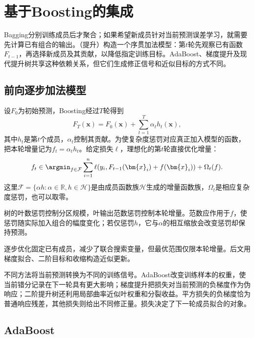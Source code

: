 \section{基于Boosting的集成}
\label{sec:ensemble-boosting}

Bagging分别训练成员后才聚合；如果希望新成员针对当前预测误差学习，就需要先计算已有组合的输出。（提升）构造一个序贯加法模型：第$t$轮先观察已有函数$F_{t-1}$，再选择新成员及其贡献，以降低指定训练目标。AdaBoost、梯度提升及现代提升树共享这种依赖关系，但它们生成修正信号和近似目标的方式不同。

\subsection{前向逐步加法模型}
\label{sec:ensemble-stagewise-additive}

设$F_0$为初始预测，Boosting经过$T$轮得到
\begin{equation}
  F_T(\bm{x})
  =
  F_0(\bm{x})
  +
  \sum_{t=1}^{T}\alpha_t h_t(\bm{x}),
  \label{eq:ensemble-additive-model}
\end{equation}
其中$h_t$是第$t$个成员，$\alpha_t$控制其贡献。为使复杂度惩罚对应真正加入模型的函数，把本轮增量记为$f_t=\alpha_t h_t$。给定损失$\ell$，理想化的第$t$轮直接优化增量：
\begin{equation}
  f_t
  \in
  \argmin_{f\in\mathcal{F}}
  \sum_{i=1}^{n}
  \ell\!\left(
    y_i,
    F_{t-1}(\bm{x}_i)+f(\bm{x}_i)
  \right)
  +\Omega_t(f).
  \label{eq:ensemble-forward-stagewise}
\end{equation}
这里$\mathcal{F}=\{\alpha h:\alpha\in\mathbb{R},h\in\mathcal{H}\}$是由成员函数族$\mathcal{H}$生成的增量函数族，$\Omega_t$是相应复杂度惩罚，也可以取零。

树的叶数惩罚控制分区规模，叶输出范数惩罚控制本轮增量。范数应作用于$f$，使惩罚随实际加入组合的幅度变化；若仅惩罚$h$，它与$\alpha$的相互缩放会改变惩罚却保持预测。

逐步优化固定已有成员，减少了联合搜索变量，但最优范围仅限本轮增量。后文用梯度拟合、二阶目标和收缩构造近似更新。

不同方法将当前预测转换为不同的训练信号。AdaBoost改变训练样本的权重，使当前错分记录在下一轮具有更大影响；梯度提升把损失对当前预测的负梯度作为伪响应；二阶提升树还利用局部曲率近似叶权重和分裂收益。平方损失的负梯度恰为普通响应残差，其他损失则给出不同修正量。损失决定了下一轮成员拟合的对象。

\subsection{AdaBoost}
\label{sec:ensemble-adaboost}

